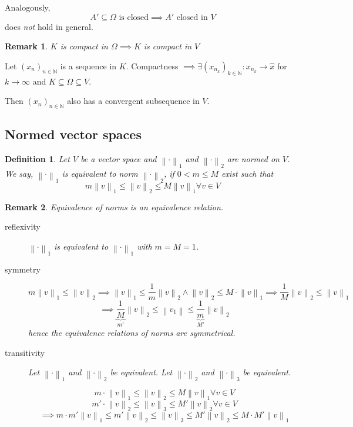 \documentclass{article}
\newtheorem{definition}{Definition}  \numberwithin{definition}{section}
\newtheorem{remark}{Remark}  \numberwithin{remark}{section}
\newcommand{\norm}[1]{\left\|#1\right\|}
\begin{document}
Analogously,
\[ A' \subseteq \Omega \text{ is closed} \implies A' \text{ closed in } V \]
does \emph{not} hold in general.

\begin{remark}
  $K$ is compact in $\Omega \implies K$ is compact in $V$
\end{remark}

Let $(x_n)_{n \in \mathbb N}$ is a sequence in $K$.
Compactness $\implies \exists (x_{n_k})_{k \in \mathbb N}: x_{n_k} \to \hat{x}$ for $k \to \infty$ and $K \subseteq \Omega \subseteq V$.

Then $(x_n)_{n \in \mathbb N}$ also has a convergent subsequence in $V$.

\subsection{Normed vector spaces}

\begin{definition} %
  Let $V$ be a vector space and $\norm{\cdot}_1$ and $\norm{\cdot}_2$ are normed on $V$.
  We say, $\norm{\cdot}_1$ is equivalent to norm $\norm{\cdot}_2$, if $0 < m \leq M$ exist such that
  \[ m \norm{v}_1 \leq \norm{v}_2 \leq M \norm{v}_1 \forall v \in V \]
\end{definition}

\begin{remark}
  Equivalence of norms is an equivalence relation.
  \begin{description}
    \item[reflexivity]
      $\norm{\cdot}_1$ is equivalent to $\norm{\cdot}_1$ with $m = M = 1$.
    \item[symmetry]
      \[ m \norm{v}_1 \leq \norm{v}_2 \implies \norm{v}_1 \leq \frac1m \norm{v}_2 \land \norm{v}_2 \leq M \cdot \norm{v}_1 \implies \frac1M \norm{v}_2 \leq \norm{v}_1 \]
      \[ \implies \underbrace{\frac1M}_{m'} \norm{v}_2 \leq \norm{v_1} \leq \underbrace{\frac1m}_{M'} \norm{v}_2 \]
      hence the equivalence relations of norms are symmetrical.
    \item[transitivity]
      Let $\norm{\cdot}_1$ and $\norm{\cdot}_2$ be equivalent.
      Let $\norm{\cdot}_2$ and $\norm{\cdot}_3$ be equivalent.

      \[ m \cdot \norm{v}_1 \leq \norm{v}_2 \leq M \norm{v}_1 \forall v \in V \]
      \[ m' \cdot \norm{v}_2 \leq \norm{v}_3 \leq M' \norm{v}_2 \forall v \in V \]
      \[ \implies m \cdot m' \norm{v}_1 \leq m' \norm{v}_2 \leq \norm{v}_3 \leq M' \norm{v}_2 \leq M \cdot M' \norm{v}_1 \]
  \end{description}
\end{remark}
\end{document}
